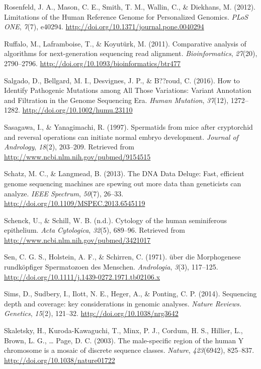 \documentclass[12pt,twoside]{reedthesis}
\theoremstyle{definition}
\theoremstyle{definition}
\theoremstyle{remark}
\begin{document}
  \hypertarget{ref-Rosenfeld2012}{}
  Rosenfeld, J. A., Mason, C. E., Smith, T. M., Wallin, C., \& Diekhans,
  M. (2012). Limitations of the Human Reference Genome for Personalized
  Genomics. \emph{PLoS ONE}, \emph{7}(7), e40294.
  \url{http://doi.org/10.1371/journal.pone.0040294}
  
  \hypertarget{ref-Ruffalo2011}{}
  Ruffalo, M., Laframboise, T., \& Koyutürk, M. (2011). Comparative
  analysis of algorithms for next-generation sequencing read alignment.
  \emph{Bioinformatics}, \emph{27}(20), 2790--2796.
  \url{http://doi.org/10.1093/bioinformatics/btr477}
  
  \hypertarget{ref-Salgado2016}{}
  Salgado, D., Bellgard, M. I., Desvignes, J. P., \& B??roud, C. (2016).
  How to Identify Pathogenic Mutations among All Those Variations: Variant
  Annotation and Filtration in the Genome Sequencing Era. \emph{Human
  Mutation}, \emph{37}(12), 1272--1282.
  \url{http://doi.org/10.1002/humu.23110}
  
  \hypertarget{ref-Sasagawa}{}
  Sasagawa, I., \& Yanagimachi, R. (1997). Spermatids from mice after
  cryptorchid and reversal operations can initiate normal embryo
  development. \emph{Journal of Andrology}, \emph{18}(2), 203--209.
  Retrieved from \url{http://www.ncbi.nlm.nih.gov/pubmed/9154515}
  
  \hypertarget{ref-Schatz2013}{}
  Schatz, M. C., \& Langmead, B. (2013). The DNA Data Deluge: Fast,
  efficient genome sequencing machines are spewing out more data than
  geneticists can analyze. \emph{IEEE Spectrum}, \emph{50}(7), 26--33.
  \url{http://doi.org/10.1109/MSPEC.2013.6545119}
  
  \hypertarget{ref-Schenck}{}
  Schenck, U., \& Schill, W. B. (n.d.). Cytology of the human seminiferous
  epithelium. \emph{Acta Cytologica}, \emph{32}(5), 689--96. Retrieved
  from \url{http://www.ncbi.nlm.nih.gov/pubmed/3421017}
  
  \hypertarget{ref-Sen2009}{}
  Sen, C. G. S., Holstein, A. F., \& Schirren, C. (1971). über die
  Morphogenese rundköpfiger Spermatozoen des Menschen. \emph{Andrologia},
  \emph{3}(3), 117--125.
  \url{http://doi.org/10.1111/j.1439-0272.1971.tb02106.x}
  
  \hypertarget{ref-Sims2014}{}
  Sims, D., Sudbery, I., Ilott, N. E., Heger, A., \& Ponting, C. P.
  (2014). Sequencing depth and coverage: key considerations in genomic
  analyses. \emph{Nature Reviews. Genetics}, \emph{15}(2), 121--32.
  \url{http://doi.org/10.1038/nrg3642}
  
  \hypertarget{ref-Skaletsky2003}{}
  Skaletsky, H., Kuroda-Kawaguchi, T., Minx, P. J., Cordum, H. S.,
  Hillier, L., Brown, L. G., \ldots{} Page, D. C. (2003). The
  male-specific region of the human Y chromosome is a mosaic of discrete
  sequence classes. \emph{Nature}, \emph{423}(6942), 825--837.
  \url{http://doi.org/10.1038/nature01722}
  
\end{document}
